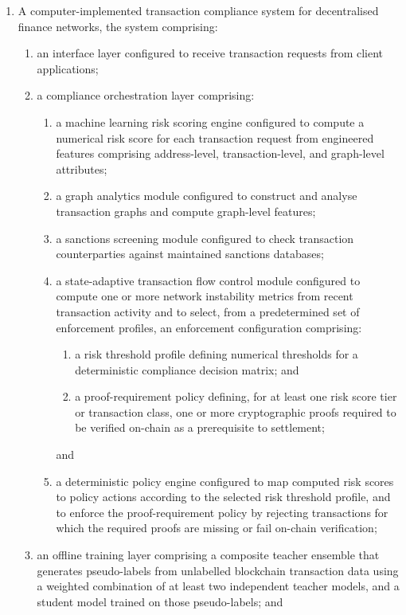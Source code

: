 \documentclass[12pt,a4paper]{article}
\begin{document}
\begin{enumerate}[label=\textbf{\arabic*.}]

\item A computer-implemented transaction compliance system for decentralised
finance networks, the system comprising:
\begin{enumerate}[label=(\alph*)]
\item an interface layer configured to receive transaction requests from
client applications;

\item a compliance orchestration layer comprising:
\begin{enumerate}[label=(\roman*)]
\item a machine learning risk scoring engine configured to compute a
numerical risk score for each transaction request from engineered features
comprising address-level, transaction-level, and graph-level attributes;
\item a graph analytics module configured to construct and analyse
transaction graphs and compute graph-level features;
\item a sanctions screening module configured to check transaction
counterparties against maintained sanctions databases;
\item a state-adaptive transaction flow control module configured to compute
one or more network instability metrics from recent transaction activity and
to select, from a predetermined set of enforcement profiles, an enforcement
configuration comprising:
\begin{enumerate}[label=(\alph*)]
\item a risk threshold profile defining numerical thresholds for a
deterministic compliance decision matrix; and
\item a proof-requirement policy defining, for at least one risk score tier
or transaction class, one or more cryptographic proofs required to be
verified on-chain as a prerequisite to settlement;
\end{enumerate}
and
\item a deterministic policy engine configured to map computed risk scores to
policy actions according to the selected risk threshold profile, and to
enforce the proof-requirement policy by rejecting transactions for which the
required proofs are missing or fail on-chain verification;
\end{enumerate}

\item an offline training layer comprising a composite teacher ensemble
that generates pseudo-labels from unlabelled blockchain transaction data
using a weighted combination of at least two independent teacher models, and
a student model trained on those pseudo-labels; and


\end{enumerate}
\end{enumerate}
\end{document}
